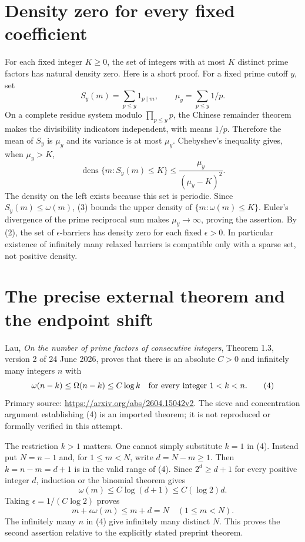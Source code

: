\documentclass[11pt]{article}
\begin{document}
\section*{Density zero for every fixed coefficient}
For each fixed integer $K\ge0$, the set of integers with at most $K$ distinct prime factors has natural density zero. Here is a short proof. For a fixed prime cutoff $y$, set
\[
 S_y(m)=\sum_{p\le y}1_{p\mid m},\qquad \mu_y=\sum_{p\le y}1/p.
\]
On a complete residue system modulo $\prod_{p\le y}p$, the Chinese remainder theorem makes the divisibility indicators independent, with means $1/p$. Therefore the mean of $S_y$ is $\mu_y$ and its variance is at most $\mu_y$. Chebyshev's inequality gives, when $\mu_y>K$,
\[
 \operatorname{dens}\{m:S_y(m)\le K\}
 \le\frac{\mu_y}{(\mu_y-K)^2}. \tag{3}
\]
The density on the left exists because this set is periodic. Since $S_y(m)\le\omega(m)$, (3) bounds the upper density of $\{m:\omega(m)\le K\}$. Euler's divergence of the prime reciprocal sum makes $\mu_y\to\infty$, proving the assertion. By (2), the set of $\epsilon$-barriers has density zero for each fixed $\epsilon>0$. In particular existence of infinitely many relaxed barriers is compatible only with a sparse set, not positive density.

\section*{The precise external theorem and the endpoint shift}
Lau, \emph{On the number of prime factors of consecutive integers}, Theorem 1.3, version 2 of 24 June 2026, proves that there is an absolute $C>0$ and infinitely many integers $n$ with
\[
 \omega(n-k)\le\Omega(n-k)\le C\log k
 \quad\hbox{for every integer }1<k<n. \tag{4}
\]
Primary source: \url{https://arxiv.org/abs/2604.15042v2}. The sieve and concentration argument establishing (4) is an imported theorem; it is not reproduced or formally verified in this attempt.

The restriction $k>1$ matters. One cannot simply substitute $k=1$ in (4). Instead put $N=n-1$ and, for $1\le m<N$, write $d=N-m\ge1$. Then $k=n-m=d+1$ is in the valid range of (4). Since $2^d\ge d+1$ for every positive integer $d$, induction or the binomial theorem gives
\[
 \omega(m)\le C\log(d+1)\le C(\log2)d.
\]
Taking $\epsilon=1/(C\log2)$ proves
\[
 m+\epsilon\omega(m)\le m+d=N
 \quad(1\le m<N).
\]
The infinitely many $n$ in (4) give infinitely many distinct $N$. This proves the second assertion relative to the explicitly stated preprint theorem.
\end{document}
